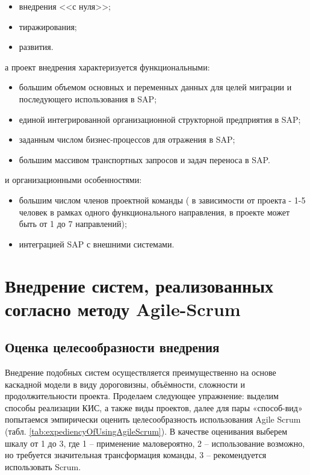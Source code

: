 \documentclass[12pt]{article}
\begin{document}
\begin{itemize}
  \item внедрения <<с нуля>>;
  \item тиражирования;
  \item развития.
\end{itemize}

\begin{flushleft}
  а проект внедрения характеризуется функциональными:
\end{flushleft}
 
\begin{itemize}
  \item большим объемом основных и переменных данных для целей миграции и последующего использования в SAP;
  \item единой интегрированной организационной структорной предприятия в SAP;
  \item заданным числом бизнес-процессов для отражения в SAP;
  \item большим массивом транспортных запросов и задач переноса в SAP.
\end{itemize}

\begin{flushleft}
  и организационными особенностями:
\end{flushleft}
 
\begin{itemize}
  \item большим числом членов проектной команды ( в зависимости от проекта - 1-5 человек в рамках одного функционального
        направления, в проекте может быть от 1 до 7 направлений);
  \item интеграцией SAP с внешними системами.
\end{itemize}


\section{Внедрение систем, реализованных согласно методу Agile-Scrum}
\subsection{Оценка целесообразности внедрения}
Внедрение подобных систем осуществляется преимущественно на основе каскадной модели в виду 
дороговизны, объёмности, сложности и продолжительности проекта. Проделаем следующее упражнение: 
выделим способы реализации КИС, а также виды проектов, далее для пары «способ-вид» попытаемся 
эмпирически оценить целесообразность использования Agile Scrum (табл. \ref{tab:expediencyOfUsingAgileScrum}). В качестве оценивания 
выберем шкалу от 1 до 3, где 1 – применение маловероятно, 2 – использование возможно, но 
требуется значительная трансформация команды, 3 – рекомендуется использовать Scrum.
\end{document}
